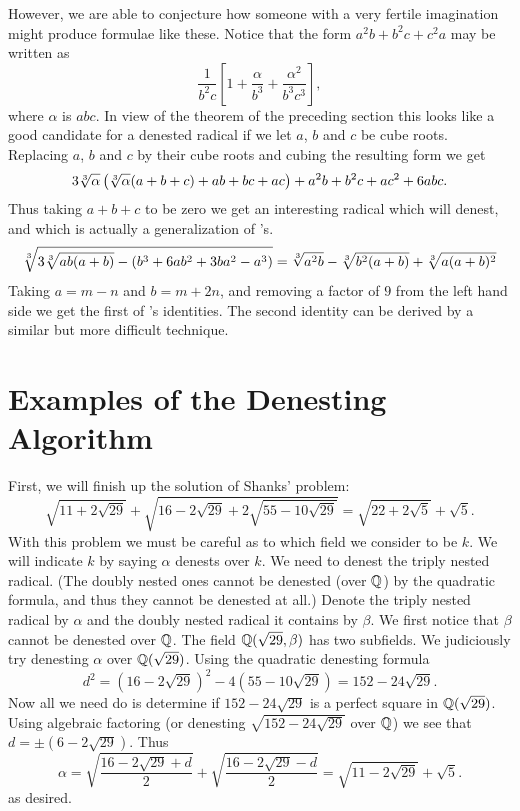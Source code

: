 However, we are able to conjecture how someone 
with a very fertile imagination might produce formulae like these.
Notice that the form $a^2 b + b^2 c + c^2 a$ may be written as 
\[
\frac{1}{b^2 c} \left[1 + \frac{\alpha}{b^3} + \frac{\alpha^2}{b^3 c^3}
\right],
\]
where $\alpha$ is $a b c$.  In view of the theorem of the preceding
section this looks like a good candidate for a denested radical if we
let $a$, $b$ and $c$ be cube roots.  Replacing $a$, $b$ and $c$
by their cube roots and cubing the resulting form we get 
\[
3 \root 3 \of {\alpha}\left( \root 3 \of {\alpha}(a + b + c) +ab + bc +ac\right)
+ a^2b + b^2c +ac^2 + 6abc.
\]
Thus taking $a + b + c$ to be zero we get an interesting radical which will 
denest, and which is actually a generalization of {\Ramanujan}'s. 
\[
\root 3 \of {3 \root 3 \of {a b (a + b)} - (b^3 + 6 a b^2 + 3 b a^2 - a^3)} =
\root 3 \of {a^2 b} - \root 3 \of {b^2 (a + b)} + \root 3 \of {a (a + b)^2}
\]
Taking $a = m - n$ and $b = m + 2 n$, and removing a factor of $9$ from
the left hand side we get the first of {\Ramanujan}'s identities.  The
second identity can be derived by a similar but more difficult technique.

\section{Examples of the Denesting Algorithm}
\label{Denesting:Examples:Sec}

First, we will finish up the solution of Shanks' problem: 
\[
\sqrt{11 + 2 \sqrt{29}} + \sqrt{16 - 2 \sqrt{29} + 2 \sqrt{55 - 10
\sqrt{29}}}
= \sqrt{22 + 2 \sqrt{5}} + \sqrt{5}.
\]
With this problem we must be careful as to which field we consider to be
$k$.  We will indicate $k$ by saying $\alpha$ denests over $k$.
We need to denest the triply nested radical.  (The doubly nested ones cannot
be denested (over $\mathbb{Q}$) by the quadratic formula, and thus they
cannot be denested at all.)  Denote the triply nested radical by $\alpha$ and
the doubly nested radical it contains by $\beta$.  We first notice that
$\beta$ cannot be denested over $\mathbb{Q}$.  The field $\mathbb{Q}(\sqrt{29}, \beta)$
has two subfields.  We judiciously try denesting $\alpha$ over
$\mathbb{Q}(\sqrt{29})$.  Using the quadratic denesting formula 
\[
d^2 = (16 - 2\sqrt{29})^2 - 4 (55 - 10\sqrt{29}) = 
152 - 24 \sqrt{29}.
\]
Now all we need do is determine if $152 - 24\sqrt{29}$ is a perfect square
in $\mathbb{Q}(\sqrt{29})$.  Using algebraic factoring (or denesting
$\sqrt{152 - 24 \sqrt{29}}$ over $\mathbb{Q}$) we see that 
$d = \pm (6 - 2 \sqrt{29})$.  Thus 
\[
\alpha = \sqrt{\frac{16 - 2 \sqrt{29} + d}{2}} +
\sqrt{\frac{16 - 2 \sqrt{29} - d}{2}} = \sqrt{11 - 2 \sqrt{29}} + \sqrt{5}.
\]
as desired.

